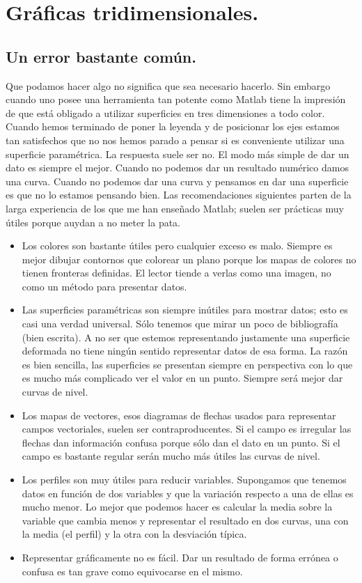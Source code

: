 \section{Gráficas tridimensionales.}


\subsection{Un error bastante común.}

Que podamos hacer algo no significa que sea necesario hacerlo. Sin
embargo cuando uno posee una herramienta tan potente como Matlab tiene
la impresión de que está obligado a utilizar superficies en tres dimensiones
a todo color. Cuando hemos terminado de poner la leyenda y de posicionar
los ejes estamos tan satisfechos que no nos hemos parado a pensar
si es conveniente utilizar una superficie paramétrica. La respuesta
suele ser no. El modo más simple de dar un dato es siempre el mejor.
Cuando no podemos dar un resultado numérico damos una curva. Cuando
no podemos dar una curva y pensamos en dar una superficie es que no
lo estamos pensando bien. Las recomendaciones siguientes parten de
la larga experiencia de los que me han enseñado Matlab; suelen ser
prácticas muy útiles porque auydan a no meter la pata.

\begin{itemize}
\item Los colores son bastante útiles pero cualquier exceso es malo. Siempre
es mejor dibujar contornos que colorear un plano porque los mapas
de colores no tienen fronteras definidas. El lector tiende a verlas
como una imagen, no como un método para presentar datos.
\item Las superficies paramétricas son siempre inútiles para mostrar datos;
esto es casi una verdad universal. Sólo tenemos que mirar un poco
de bibliografía (bien escrita). A no ser que estemos representando
justamente una superficie deformada no tiene ningún sentido representar
datos de esa forma. La razón es bien sencilla, las superficies se
presentan siempre en perspectiva con lo que es mucho más complicado
ver el valor en un punto. Siempre será mejor dar curvas de nivel.
\item Los mapas de vectores, esos diagramas de flechas usados para representar
campos vectoriales, suelen ser contraproducentes. Si el campo es irregular
las flechas dan información confusa porque sólo dan el dato en un
punto. Si el campo es bastante regular serán mucho más útiles las
curvas de nivel.
\item Los perfiles son muy útiles para reducir variables. Supongamos que
tenemos datos en función de dos variables y que la variación respecto
a una de ellas es mucho menor. Lo mejor que podemos hacer es calcular
la media sobre la variable que cambia menos y representar el resultado
en dos curvas, una con la media (el perfil) y la otra con la desviación
típica.
\item Representar gráficamente no es fácil. Dar un resultado de forma errónea
o confusa es tan grave como equivocarse en el mismo.
\end{itemize}

